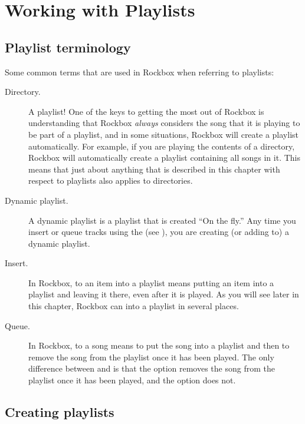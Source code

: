 \section{\label{ref:working_with_playlists}Working with Playlists}

\subsection{Playlist terminology}
Some common terms that are used in Rockbox when referring to
playlists:

\begin{description}
\item[Directory.] A playlist! One of the keys to getting the most out of
  Rockbox is understanding that Rockbox \emph{always} considers the song that
  it is playing to be part of a playlist, and in some situations, Rockbox will
  create a playlist automatically. For example, if you are playing the
  contents of a directory, Rockbox will automatically create a playlist
  containing all songs in it. This means that just about anything
  that is described in this chapter with respect to playlists also applies to
  directories.

\item[Dynamic playlist.]  A dynamic playlist is a playlist that is created
  ``On the fly.'' Any time you insert or queue tracks using the
   (see ), you are
  creating (or adding to) a dynamic playlist.

\item[Insert.] In Rockbox, to  an item into a playlist means
  putting an item into a playlist and leaving it there, even after it is
  played. As you will see later in this chapter, Rockbox can 
  into a playlist in several places.

\item[Queue.] In Rockbox, to  a song means to put the song
  into a playlist and then to remove the song from the playlist once it has
  been played. The only difference between  and
   is that the  option removes the song from the
  playlist once it has been played, and the  option does not.
\end{description}

\subsection{Creating playlists}

